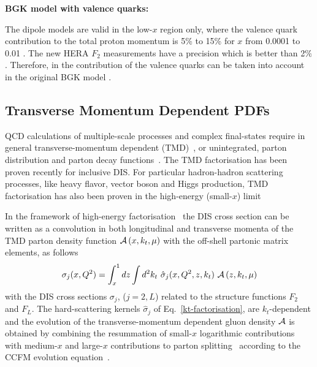 \begin{description}
\vspace{0.1cm}
\item \bf {BGK model with valence quarks:} \rm

The dipole models are valid in the low-$x$ region only, where the valence quark contribution to the total proton momentum 
is 5\% to 15\% for $x$ from 0.0001 to 0.01 \cite{Collaboration:2010ry}.
The new HERA $F_2$ measurements have a precision which is better than 2$\%$. 
Therefore, in \fitter the contribution of the valence quarks can be taken into account in the original 
BGK model \cite{Luszczak:2013rxa}.
\end{description}

\subsection{Transverse Momentum Dependent PDFs}


\def\kt{\ensuremath{k_t}}
\def\pt{\ensuremath{p_t}}


QCD calculations of multiple-scale processes  and complex final-states
require in general transverse-momentum dependent (TMD)~\cite{Collins:2011zzd}, or 
unintegrated, parton distribution and parton decay 
functions~\cite{Aybat:2011zv,Buffing:2013eka,Buffing:2013kca,Buffing:2012sz,Mulders:2008tf,Jadach:2009gm,Hautmann:2009zzb,Hautmann:2012pf,Hautmann:2007gw}.   
The TMD factorisation has been proven recently \cite{Collins:2011zzd} for inclusive DIS. For 
particular hadron-hadron scattering processes, like heavy flavor, vector boson and Higgs production, 
TMD factorisation has also been proven in the high-energy (small-$x$) limit \cite{Catani:1990xk,Collins:1991ty,Hautmann:2010be}
  
In the framework of high-energy factorisation~\cite{Catani:1990xk,Catani:1990eg,Catani:1993ww} 
the DIS cross section can be written as a convolution in 
both longitudinal and transverse momenta of the TMD parton density function 
${\cal A}\left(x,\kt,\mu\right)$    
 with the off-shell partonic matrix elements, as follows 
\begin{equation}
 \sigma_j (x, Q^2) = \int_x^1  
d z \int d^2k_t \ 
\hat{\sigma}_j(x,Q^2,{z},k_t) \ 
 {\cal  A}\left( {z} ,\kt, \mu \right) 
\label{kt-factorisation}
\end{equation}
with the DIS cross sections 
$\sigma_j$, ($j= 2 , L$) related to the  structure functions $F_2$ and $F_L$.
The hard-scattering kernels ${\hat \sigma}_j$ of Eq.~\ref{kt-factorisation},    
are $k_t$-dependent and the evolution  of the 
transverse-momentum dependent gluon density 
${\cal A} $ is obtained by combining the resummation of small-$x$ logarithmic 
contributions~\cite{Lipatov:1996ts,Fadin:1975cb,Balitsky:1978ic} with medium-$x$ and large-$x$ 
contributions to parton  splitting~\cite{Gribov:1972ri,Altarelli:1977zs,Dokshitzer:1977sg} according to the 
CCFM evolution equation~\cite{Ciafaloni:1987ur,Catani:1989sg,Marchesini:1994wr}.
  
